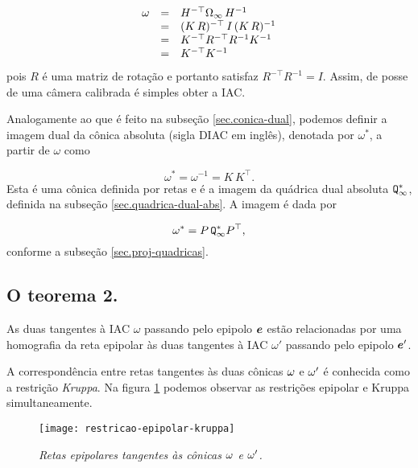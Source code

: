 \begin{equation*}
\begin{array}{rcl}
{\bf \omega}&=&H^{-\top}\Omega_\infty\,H^{-1}\\
&=&(K\,R)^{-\top}\,I\,(K\,R)^{-1}\\
&=&K^{-\top}R^{-\top}R^{-1}K^{-1}\\
&=&K^{-\top}K^{-1}
\end{array}
\end{equation*}
pois $R$ é uma matriz de rotação e portanto satisfaz $R^{-\top}R^{-1}=I$. Assim, de posse de uma câmera calibrada é simples obter a IAC.

Analogamente ao que é feito na subseção \ref{sec.conica-dual}, podemos definir a imagem dual da cônica absoluta (sigla DIAC em inglês), denotada por $\omega^*$, a partir de $\omega$ como

\begin{equation*}
\omega^*=\omega^{-1}=K\,K^\top.
\end{equation*}
Esta é uma cônica definida por retas e é a imagem da quádrica dual absoluta ${\tt Q^*_\infty}$, definida na subseção \ref{sec.quadrica-dual-abs}. A imagem é dada por

\begin{equation*}
\omega^*=P\,{\tt Q^*_\infty}P^\top,
\end{equation*}
conforme a subseção \ref{sec.proj-quadricas}.\\

\subsection{O teorema 2.}\label{sec.teorema-2}

\begin{teorema}
As duas tangentes à IAC $\omega$ passando pelo epipolo $\boldsymbol{e}$ estão relacionadas por uma homografia da reta epipolar às duas tangentes à IAC $\omega'$ passando pelo epipolo $\boldsymbol{e}'$.
\end{teorema}

A correspondência entre retas tangentes às duas cônicas ${\bf \omega}$ e ${\bf \omega'}$ é conhecida como a restrição \textit{Kruppa}. Na figura \ref{epipolar-kruppa} podemos observar as restrições epipolar e Kruppa simultaneamente.

\begin{figure}[!htb]
\centering
\texttt{[image: restricao-epipolar-kruppa]}
\caption{\textit{Retas epipolares tangentes às cônicas ${\bf \omega}$ e ${\bf \omega'}$.}}
\label{epipolar-kruppa}
\end{figure}

